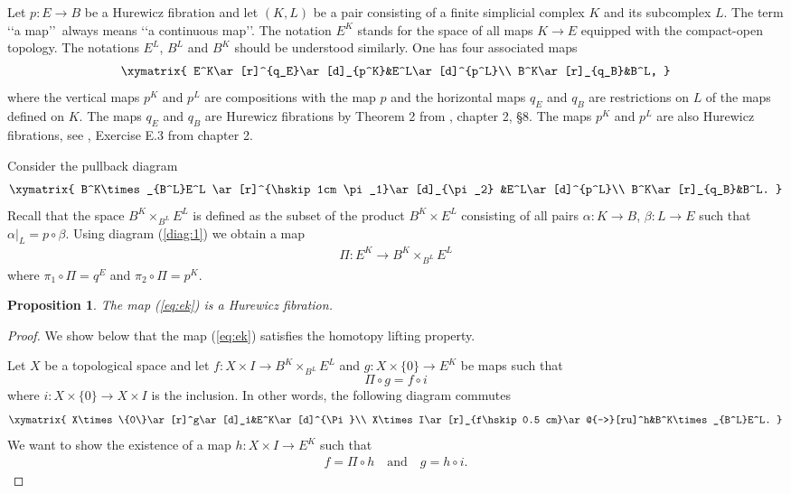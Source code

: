 \documentclass[11pt]{amsart}
\newtheorem{proposition}[theorem]{Proposition}
\begin{document}
{Let $p: E\to B$ be a Hurewicz fibration and let $(K, L)$ be a pair consisting of a finite simplicial complex $K$ and its subcomplex $L$. 
The term \lq\lq a map\rq\rq\  always means  \lq\lq a continuous map\rq\rq. The notation $E^K$ stands for the space of all maps $K\to E$ equipped with the compact-open topology.  The notations $E^L$, $B^L$ and $B^K$ should be understood similarly. 
One has four associated maps
\begin{eqnarray}\label{diag:1}
\xymatrix{
E^K\ar[r]^{q_E}\ar[d]_{p^K}&E^L\ar[d]^{p^L}\\
B^K\ar[r]_{q_B}&B^L,
}
\end{eqnarray}
where the vertical maps $p^K$ and $p^L$ are compositions with the map $p$ and the horizontal maps $q_E$ and $q_B$ are restrictions 
on $L$ of the maps defined on $K$. The maps $q_E$ and $q_B$ are Hurewicz fibrations by Theorem 2 from \cite{Sp}, chapter 2, \S 8. The maps $p^K$ and $p^L$ are also Hurewicz fibrations, see \cite{Sp}, Exercise E.3 from chapter 2. 

Consider the pullback diagram 
\begin{eqnarray}\label{diag:2}
\xymatrix{
B^K\times_{B^L}E^L \ar[r]^{\hskip 1cm \pi_1}\ar[d]_{\pi_2} &E^L\ar[d]^{p^L}\\
B^K\ar[r]_{q_B}&B^L.
}
\end{eqnarray}
Recall that the space $B^K\times_{B^L}E^L$ is defined as the subset of the product $B^K\times E^L$ consisting of all pairs $\alpha: K\to B$, $\beta:L\to E$ such that $\alpha|_L =p\circ \beta$. Using diagram (\ref{diag:1}) we obtain a map 
\begin{eqnarray}\label{eq:ek}
\Pi: E^K\to B^K\times_{B^L}E^L 
\end{eqnarray}
where $\pi_1\circ \Pi=q^E$ and $\pi_2\circ \Pi=p^K$. 

\begin{proposition}\label{prop:app}
The  map (\ref{eq:ek}) 
is a Hurewicz fibration. 
\end{proposition}
\begin{proof} We show below that the map (\ref{eq:ek}) satisfies the homotopy lifting property. 

Let $X$ be a topological space and let $f: X\times I\to B^K\times_{B^L}E^L$ and $g: X\times\{0\}\to E^K$ be maps such that 
$$\Pi\circ g=f\circ i$$ where $i: X\times \{0\}\to X\times I$ is the inclusion. In other words, the following diagram commutes
$$
\xymatrix{
X\times\{0\}\ar[r]^g\ar[d]_i&E^K\ar[d]^{\Pi}\\
X\times I\ar[r]_{f\hskip 0.5 cm}\ar@{-->}[ru]^h&B^K\times_{B^L}E^L.
}
$$
We want to show the existence of a map $h: X\times I\to E^K$ such that 
\begin{eqnarray}\label{eq:want}
f=\Pi\circ h \quad \mbox{and}\quad  g=h\circ i. 
\end{eqnarray}


\end{proof}}
\end{document}
